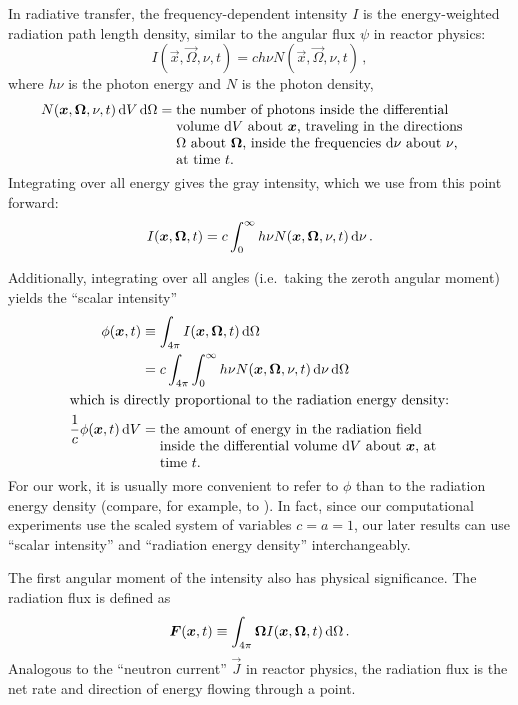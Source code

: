 In radiative transfer, the frequency-dependent intensity $I$ is the
energy-weighted radiation path
length density, similar to the angular flux $\psi$ in reactor physics:
\begin{equation*}
  I(\vec{x},\vec{\Omega},\nu, t) = c h\nu N(\vec{x},\vec{\Omega},\nu, t)\,,
\end{equation*}
where $h\nu$ is the photon energy and $N$ is the photon density,
\begin{align*}
  N(\vec{x},\vec{\Omega}, \nu, t) \ud V \ud \Omega
  &= \topbox{the number of photons inside the differential volume $\ud V$
  about $\vec{x}$, traveling in the directions $\Omega$ about
  $\vec{\Omega}$, inside the frequencies $\ud \nu$ about $\nu$, at time $t$.}
\end{align*}
Integrating over all energy gives the gray intensity, which we use from this point forward:
\begin{equation*}
  I(\bm{x},\bm{\Omega}, t)
  = c \int_0^\infty h\nu N(\bm{x},\bm{\Omega},\nu, t) \mathop{}\!\mathrm{d}\nu \,.
\end{equation*}

Additionally, integrating over all angles (i.e.~taking the zeroth angular
moment) yields the ``scalar intensity''
\begin{align} \label{eq:intensityZeroth}
  \phi(\vec{x},t) &\equiv \int_{4\pi} I(\vec{x},\vec{\Omega}, t) \ud \Omega
  \\
  &= c \int_{4\pi} \int_0^\infty h\nu N(\vec{x},\vec{\Omega},\nu, t) \ud\nu
   \ud \Omega
\\ \intertext{which is directly proportional to the radiation energy density:}
\nonumber
\frac{1}{c} \phi(\vec{x},t) \ud V
&= \topbox{the amount of energy in the radiation field inside the differential
  volume $\ud V$ about $\vec{x}$, at time $t$.}
\end{align}
For our work, it is usually more convenient to refer to $\phi$ than to the
radiation energy density (compare, for example, \cite{Den2007} to
\cite{Kno1999a}). In fact, since our computational experiments use the
scaled system of variables $c=a=1$, our later results can use ``scalar
intensity'' and ``radiation energy density'' interchangeably.

The first angular moment of the intensity also has physical significance. The
radiation flux is defined as
\begin{equation} \label{eq:intensityFirst}
  \bm{F}(\bm{x},t) \equiv \int_{4\pi} \bm{\Omega}
  I(\bm{x},\bm{\Omega}, t) \mathop{}\!\mathrm{d} \Omega \,.
\end{equation}
Analogous to the ``neutron current'' $\vec{J}$ in reactor physics, the
radiation flux is the net rate and direction of energy flowing through a point.

